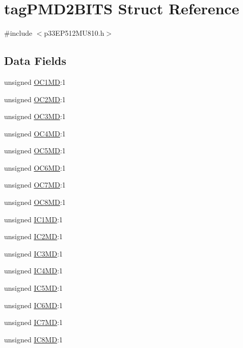 \hypertarget{structtag_p_m_d2_b_i_t_s}{}\section{tag\+P\+M\+D2\+B\+I\+TS Struct Reference}
\label{structtag_p_m_d2_b_i_t_s}


{\ttfamily \#include $<$p33\+E\+P512\+M\+U810.\+h$>$}

\subsection*{Data Fields}
\begin{DoxyCompactItemize}
\item 
unsigned \hyperlink{structtag_p_m_d2_b_i_t_s_a33fcba8a013d9f199e81dc23798f5995}{O\+C1\+MD}\+:1
\item 
unsigned \hyperlink{structtag_p_m_d2_b_i_t_s_a427f2eb514c20c1faf022f0f80a64038}{O\+C2\+MD}\+:1
\item 
unsigned \hyperlink{structtag_p_m_d2_b_i_t_s_ad34fc9c412b9a253c5e23de8a9d53791}{O\+C3\+MD}\+:1
\item 
unsigned \hyperlink{structtag_p_m_d2_b_i_t_s_ad7aff3a4fe294c8bdb7d1b42cab8bb0e}{O\+C4\+MD}\+:1
\item 
unsigned \hyperlink{structtag_p_m_d2_b_i_t_s_a85447918e96e0e9aef4c5fb4eb88bbbb}{O\+C5\+MD}\+:1
\item 
unsigned \hyperlink{structtag_p_m_d2_b_i_t_s_a7ef2d8d1de8ad16c7661df2157bc032d}{O\+C6\+MD}\+:1
\item 
unsigned \hyperlink{structtag_p_m_d2_b_i_t_s_ac482985ea838ba0adf7d1a1c73a09dc4}{O\+C7\+MD}\+:1
\item 
unsigned \hyperlink{structtag_p_m_d2_b_i_t_s_aa36bb076f105a4c034ef050cf8913273}{O\+C8\+MD}\+:1
\item 
unsigned \hyperlink{structtag_p_m_d2_b_i_t_s_a716957b384e38a02259a65fdc807a25e}{I\+C1\+MD}\+:1
\item 
unsigned \hyperlink{structtag_p_m_d2_b_i_t_s_a95462f303c766d07b70b7692ee350c11}{I\+C2\+MD}\+:1
\item 
unsigned \hyperlink{structtag_p_m_d2_b_i_t_s_a18beef88fbc1d698750848bcc2624032}{I\+C3\+MD}\+:1
\item 
unsigned \hyperlink{structtag_p_m_d2_b_i_t_s_a7f980ae9d9595ca7fc03728efc0bd686}{I\+C4\+MD}\+:1
\item 
unsigned \hyperlink{structtag_p_m_d2_b_i_t_s_a188580d506437099985c670029bd1e5a}{I\+C5\+MD}\+:1
\item 
unsigned \hyperlink{structtag_p_m_d2_b_i_t_s_a10c7cfb68489b144a7ec02bd2fdfdffa}{I\+C6\+MD}\+:1
\item 
unsigned \hyperlink{structtag_p_m_d2_b_i_t_s_a72346fca89cf32377f2a17b07d8d4eae}{I\+C7\+MD}\+:1
\item 
unsigned \hyperlink{structtag_p_m_d2_b_i_t_s_a969c0bb6c2521871dd5139f2b9d1af4c}{I\+C8\+MD}\+:1
\end{DoxyCompactItemize}


